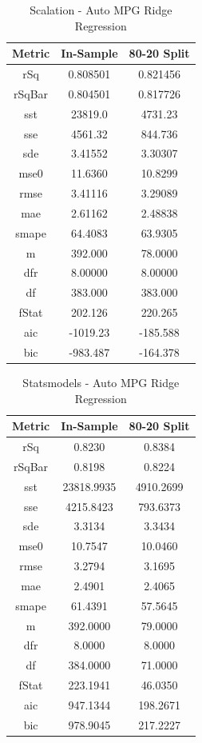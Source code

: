 \documentclass{article}
\begin{document}
\begin{table}[H]
\centering
\caption{Scalation - Auto MPG Ridge Regression}
\label{tab:Scalation - Auto MPG Ridge Regression}
\begin{tabular}{|c|c|c|} \hline 
Metric & In-Sample & 80-20 Split \\ \hline \hline 
rSq &0.808501 & 0.821456 \\ \hline 
rSqBar &0.804501 &      0.817726 \\ \hline 
sst &23819.0 &  4731.23 \\ \hline 
sse &4561.32 &  844.736 \\ \hline 
sde &3.41552 &  3.30307 \\ \hline 
mse0 &11.6360 & 10.8299 \\ \hline 
rmse &3.41116 & 3.29089 \\ \hline 
mae &2.61162 &  2.48838 \\ \hline 
smape &64.4083 &        63.9305 \\ \hline 
m &392.000 &    78.0000 \\ \hline 
dfr &8.00000 &  8.00000 \\ \hline 
df &383.000 &   383.000 \\ \hline 
fStat &202.126 &        220.265 \\ \hline 
aic &-1019.23 & -185.588 \\ \hline 
bic &-983.487 & -164.378 \\ \hline 
\end{tabular}
\end{table}

\begin{table}[H]
\centering
\caption{Statsmodels - Auto MPG Ridge Regression}
\label{tab:Statsmodels - Auto MPG Ridge Regression}
\begin{tabular}{|c|c|c|}\hline
Metric & In-Sample & 80-20 Split \\ \hline \hline
rSq & 0.8230 & 0.8384 \\ \hline
rSqBar & 0.8198 & 0.8224 \\ \hline
sst & 23818.9935 & 4910.2699 \\ \hline
sse & 4215.8423 & 793.6373 \\ \hline
sde & 3.3134 & 3.3434 \\ \hline
mse0 & 10.7547 & 10.0460 \\ \hline
rmse & 3.2794 & 3.1695 \\ \hline
mae & 2.4901 & 2.4065 \\ \hline
smape & 61.4391 & 57.5645 \\ \hline
m & 392.0000 & 79.0000 \\ \hline
dfr & 8.0000 & 8.0000 \\ \hline
df & 384.0000 & 71.0000 \\ \hline
fStat & 223.1941 & 46.0350 \\ \hline
aic & 947.1344 & 198.2671 \\ \hline
bic & 978.9045 & 217.2227 \\ \hline
\end{tabular}
\end{table}
\end{document}
